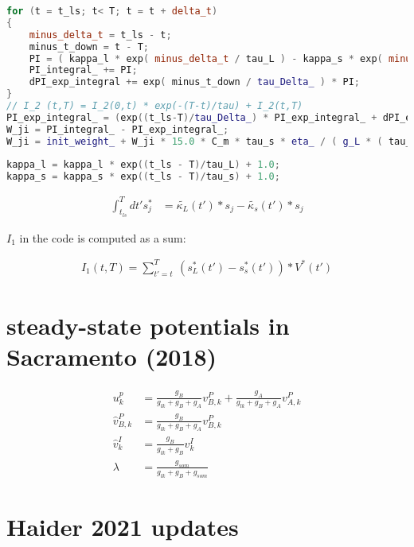 \begin{lstlisting}[language=C++, directivestyle={\color{black}}
                   emph={int,char,double,float,unsigned,exp},
                   emphstyle={\color{blue}}]
for (t = t_ls; t< T; t = t + delta_t)
{
   	minus_delta_t = t_ls - t;
    minus_t_down = t - T;
    PI = ( kappa_l * exp( minus_delta_t / tau_L ) - kappa_s * exp( minus_delta_t / tau_s ) ) * V_star(t);
    PI_integral_ += PI;
    dPI_exp_integral += exp( minus_t_down / tau_Delta_ ) * PI;
}  
// I_2 (t,T) = I_2(0,t) * exp(-(T-t)/tau) + I_2(t,T)
PI_exp_integral_ = (exp((t_ls-T)/tau_Delta_) * PI_exp_integral_ + dPI_exp_integral);
W_ji = PI_integral_ - PI_exp_integral_;
W_ji = init_weight_ + W_ji * 15.0 * C_m * tau_s * eta_ / ( g_L * ( tau_L - tau_s ) );    
  
kappa_l = kappa_l * exp((t_ls - T)/tau_L) + 1.0;
kappa_s = kappa_s * exp((t_ls - T)/tau_s) + 1.0;
  \end{lstlisting}


\begin{align}
  \int_{t_{ls}}^T dt' s_j^* & =  \tilde{\kappa_L}(t') * s_j -  \tilde{\kappa_s}(t') * s_j
\end{align}

$I_1$ in the code is computed as a sum:

\begin{align}
  I_1 (t,T) = \sum_{t'=t}^T \ (s_L^*(t') - s_s^*(t')) * V^*(t')
\end{align}


\section{steady-state potentials in Sacramento (2018)}

\begin{align}
  u_k^p           & = \frac{g_B}{g_{lk} + g_B + g_A} v^P_{B,k} + \frac{g_A}{g_{lk} + g_B + g_A} v^P_{A,k} \\
  \hat{v}^P_{B,k} & = \frac{g_B}{g_{lk} + g_B + g_A} v^P_{B,k}                                            \\
  \hat{v}^I_{k}   & = \frac{g_B}{g_{lk} + g_B} v^I_{k}                                                    \\
  \lambda         & = \frac{g_{som}}{g_{lk} + g_B + g_{som}}
\end{align}



\section{Haider 2021 updates}

